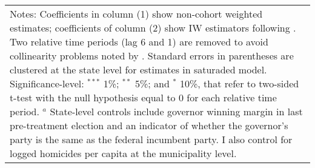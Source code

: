 \begin{table}[htbp]
{\begin{tabular}{lcc}
\multicolumn{3}{p{0.65\textwidth}}{\footnotesize{Notes: Coefficients in column (1) show non-cohort weighted estimates; coefficients of column (2) show IW estimators following \citet{abraham_sun_2020}. Two relative time periods (lag 6 and 1) are removed to avoid collinearity problems noted by \citet{abraham_sun_2020}. Standard errors in parentheses are clustered at the state level for estimates in saturaded model. Significance-level: $^{***}$ 1\%; $^{**}$ 5\%; and $^*$ 10\%, that refer to two-sided t-test with the null hypothesis equal to 0 for each relative time period. $^a$ State-level controls include governor winning margin in last pre-treatment election and an indicator of whether the governor's party is the same as the federal incumbent party. I also control for logged homicides per capita at the municipality level.}} \\
\end{tabular}
}
\end{table}
